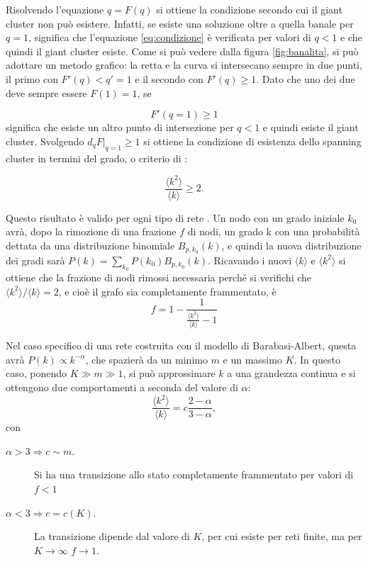 Risolvendo l'equazione $q = F(q)$ si ottiene la condizione secondo cui il giant cluster non pu\`o esistere. Infatti, se esiste una soluzione oltre a quella banale per $q=1$, significa che l'equazione \ref{eq:condizione} \`e verificata per valori di $q<1$ e che quindi il giant cluster esiste. Come si pu\`o vedere dalla figura \ref{fig:banalita}, si pu\`o adottare un metodo grafico: la retta e la curva si intersecano sempre in due punti, il primo con $F'(q)<q'=1$ e il secondo con $F'(q) \geq 1$. Dato che uno dei due deve sempre essere $F(1)=1$, se 

$$F'(q=1) \geq 1 $$
significa che esiste un altro punto di intersezione per $q<1$ e quindi esiste il giant cluster.
Svolgendo $d_qF|_{q=1} \geq 1$ si ottiene la condizione di esistenza dello spanning cluster in termini del grado, o criterio di \textcite{Molloy1995}:

\begin{equation}
\label{eq:criterion}
	\frac{\langle k^2\rangle}{\langle k \rangle}\geq 2.
\end{equation}



Questo risultato \`e valido per ogni tipo di rete \parencite{Cohen2000}. Un nodo con un grado iniziale $k_0$ avr\`a, dopo la rimozione di una frazione $f$ di nodi, un grado k con una probabilit\`a dettata da una distribuzione binomiale $B_{p,k_0}(k)$, e quindi la nuova distribuzione dei gradi sar\`a $P(k) = \sum_{k_0} P(k_0)B_{p,k_0}(k)$. Ricavando i nuovi $\langle k \rangle$ e $\langle k^2 \rangle$ si ottiene che la frazione di nodi rimossi necessaria perch\'e si verifichi che $\langle k^2\rangle/\langle k \rangle = 2$, e cio\`e il grafo sia completamente frammentato, \`e 
\begin{equation}
\label{eq:criterionfreq}
	f = 1 - \frac{1}{\frac{\langle k^2 \rangle}{\langle k \rangle}-1}
\end{equation}

Nel caso specifico di una rete costruita con il modello di Barabasi-Albert, questa avr\`a $P(k)\propto k^{-\alpha}$, che spazier\`a da un minimo $m$ e un massimo $K$. In questo caso, ponendo $K\gg m \gg 1$, si pu\`o approssimare $k$ a una grandezza continua e si ottengono due comportamenti a seconda del valore di $\alpha$:
 \[\frac{\langle k^2\rangle}{\langle k \rangle} = c \frac{2-\alpha}{3-\alpha},\]
 con
\begin{description}
	\item[$\alpha > 3 \Rightarrow c\sim m.$] Si ha una transizione allo stato completamente frammentato per valori di $f<1$
	\item[$\alpha < 3 \Rightarrow c=c(K).$] La transizione dipende dal valore di $K$, per cui esiste per reti finite, ma per $K \rightarrow \infty$ $f\rightarrow1$.
\end{description}

